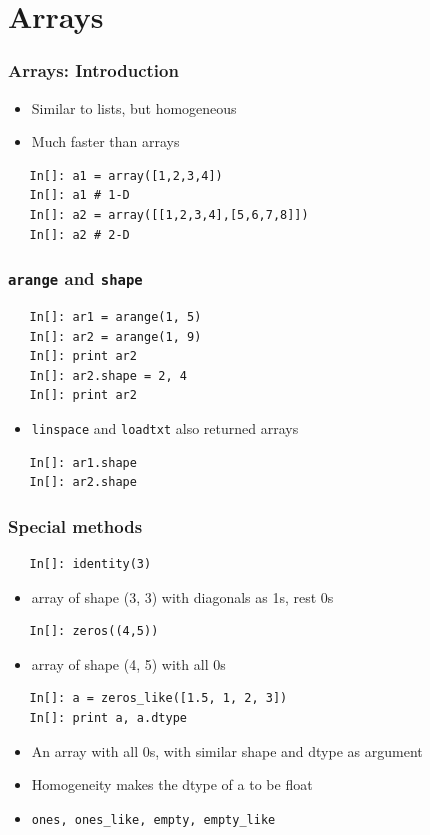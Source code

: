 \section{Arrays}

\begin{frame}[fragile]
  \frametitle{Arrays: Introduction}
  \begin{itemize}
  \item Similar to lists, but homogeneous
  \item Much faster than arrays
  \end{itemize}
  \begin{lstlisting}
   In[]: a1 = array([1,2,3,4])
   In[]: a1 # 1-D
   In[]: a2 = array([[1,2,3,4],[5,6,7,8]])
   In[]: a2 # 2-D
  \end{lstlisting}
\end{frame}

\begin{frame}[fragile]
  \frametitle{\texttt{arange} and \texttt{shape}}
  \begin{lstlisting}
   In[]: ar1 = arange(1, 5)
   In[]: ar2 = arange(1, 9) 
   In[]: print ar2
   In[]: ar2.shape = 2, 4
   In[]: print ar2
  \end{lstlisting}
  \begin{itemize}
  \item \texttt{linspace} and \texttt{loadtxt} also returned arrays
  \end{itemize}
  \begin{lstlisting}
   In[]: ar1.shape
   In[]: ar2.shape
  \end{lstlisting}
\end{frame}

\begin{frame}[fragile]
  \frametitle{Special methods}
  \begin{lstlisting}
   In[]: identity(3)
  \end{lstlisting}
  \begin{itemize}
  \item array of shape (3, 3) with diagonals as 1s, rest 0s
  \end{itemize}
  \begin{lstlisting}
   In[]: zeros((4,5))
  \end{lstlisting}
  \begin{itemize}
  \item array of shape (4, 5) with all 0s
  \end{itemize}
  \begin{lstlisting}
   In[]: a = zeros_like([1.5, 1, 2, 3])
   In[]: print a, a.dtype
  \end{lstlisting}
  \begin{itemize}
  \item An array with all 0s, with similar shape and dtype as argument
  \item Homogeneity makes the dtype of a to be float
  \item \texttt{ones, ones\_like, empty, empty\_like}
  \end{itemize}
\end{frame}

